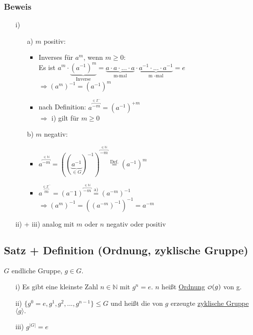 \documentclass[12pt,titlepage, pdf]{article}
\newcommand\smallO{
	\mathchoice
	{{\scriptstyle\mathcal{O}}}
	{{\scriptstyle\mathcal{O}}}
	{{\scriptscriptstyle\mathcal{O}}}
	{\scalebox{.7}{$\scriptscriptstyle\mathcal{O}$}}
}
\newcommand{\uline}[1]{\underline{#1}}
\renewcommand{\>}{\rightarrow}
\renewcommand{\*}{\cdot}
\begin{document}
	\subsubsection*{Beweis}
	\begin{itemize}
		\item[i)] 
		\begin{itemize}
			\item[a)] $m$ positiv:
			\begin{itemize}
				\item Inverses für $a^m$, wenn $m \geq 0:$ \\
				Es ist $a^m  \cdot \underbrace{(a^{-1})^m}_{\text{Inverse}} = \underbrace{a \cdot a \cdot ... \cdot a}_{\text{m-mal}} \cdot \underbrace{ a^{-1} \cdot ... \cdot a^{-1}}_{\text{m -mal}} = e$ \\
				$\Rightarrow (a^m)^{-1}= (a^{-1})^m$
				\item nach Definition: $a^{\overbracket{-m}^{\in \mathds{Z^-}}} = (a^{-1})^{+m}$ \\
				$\Rightarrow$ i) gilt für $m \geq 0$
			\end{itemize}
			\item[b)] $m$ negativ:
			\begin{itemize}
				\item $a^{\overbracket{-m}^{ \in \mathds{N}}} = ((\underbrace{a^{-1}}_{\in G})^{-1})^{\overbracket{-m}^{ \in \mathds{N}}} \overset{\textrm{Def.}}{=} (a^{-1})^m$
				\item $a^{\overbracket{m}^{ \in \mathds{Z}^-}} = (a^-1)^{\overbracket{-m}^{ \in \mathds{N}}} \overset{\textrm{a)}}{=} (a^{-m})^{-1}$\\$ \Rightarrow (a^m)^{-1} = ((a^{-m})^{-1})^{-1} = a^{-m}$
			\end{itemize}	
		\end{itemize}
		\item[ii) + iii)] analog mit $m$ oder $n$ negativ oder positiv 
	\end{itemize}
	\subsection{Satz + Definition (Ordnung, zyklische Gruppe)}
	$G$ endliche Gruppe, $g \in G$. 
	\begin{itemize}
		\item[i)] Es gibt eine kleinste Zahl $n \in \mathds{N}$ mit $g^n = e$.
		$n$ heißt \uline{Ordnung} $\smallO(g)$ von g.
		\item[ii)] $\{g^0 = e, g^1, g^2,...,g^{n-1}\} \leq G$ und heißt die von $g$ erzeugte \uline{zyklische Gruppe} $\langle g \rangle.$
		\item[iii)] $g^{|G|} = e$
	\end{itemize}
\end{document}
